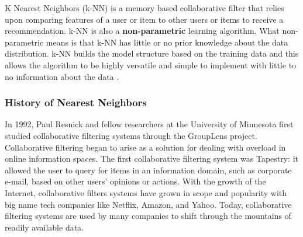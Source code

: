 \documentclass{report}
\begin{document}
K Nearest Neighbors (k-NN) is a memory based collaborative filter that relies upon comparing features of a user or item to other users or items to receive a recommendation. 
k-NN is also a \textbf{non-parametric} learning algorithm. What non-parametric means is that k-NN has little or no prior knowledge about the data distribution. k-NN  builds the model structure based on the training data and this allows the algorithm to be highly versatile and simple to implement with little to no information about the data \cite{3}. 

\subsubsection*{History of Nearest Neighbors}

In 1992, Paul Resnick and fellow researchers at the University of Minnesota first studied collaborative filtering systems through the GroupLens project\cite{2}\cite{8}.  Collaborative filtering began to arise as a solution for dealing with overload in online information spaces. The first collaborative filtering system was Tapestry: it allowed the user to query for
items in an information domain, such as corporate e-mail, based on
other users’ opinions or actions\cite{6}. With the growth of the Internet, collaborative filters systems have grown in scope and popularity with big name tech companies like Netflix, Amazon, and Yahoo. Today, collaborative filtering systems are used by many companies to shift through the mountains of readily available data.
\end{document}
